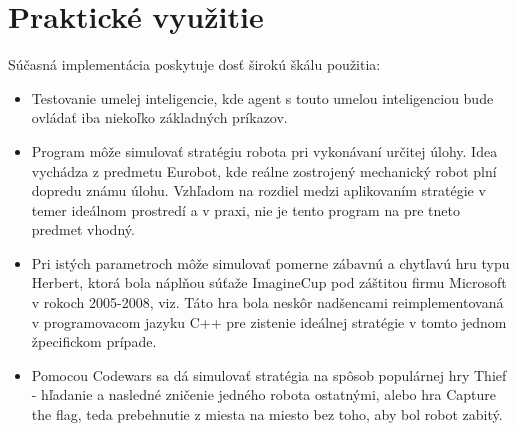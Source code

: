 \documentclass[12pt,notitlepage]{report}
\begin{document}
\section{Praktické využitie}
Súčasná implementácia poskytuje dosť širokú škálu použitia:\\
	\begin{itemize}
	\item Testovanie umelej inteligencie, kde agent s touto umelou inteligenciou bude ovládať iba niekoľko základných príkazov.
	\item Program môže simulovať stratégiu robota pri vykonávaní určitej úlohy. Idea vychádza z predmetu Eurobot, kde reálne zostrojený mechanický robot plní dopredu známu úlohu. Vzhľadom na rozdiel medzi aplikovaním stratégie v temer ideálnom prostredí a v praxi, nie je tento program na pre tneto predmet vhodný.
	\item Pri istých parametroch môže simulovať pomerne zábavnú a chytľavú hru typu Herbert, ktorá bola náplňou súťaže ImagineCup pod záštitou firmu Microsoft v rokoch 2005-2008, viz\cite{simtool}. Táto hra bola neskôr nadšencami reimplementovaná v programovacom jazyku C++ pre zistenie ideálnej stratégie v tomto jednom žpecifickom prípade. %
	\item Pomocou Codewars sa dá simulovať stratégia na spôsob populárnej hry Thief - hľadanie a nasledné zničenie jedného robota ostatnými, alebo hra Capture the flag, teda prebehnutie z miesta na miesto bez toho, aby bol robot zabitý.
	\end{itemize}


\end{document}
